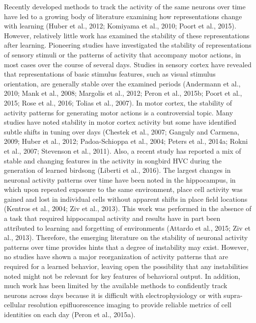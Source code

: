 Recently developed methods to track the activity of the same neurons over time have led to a growing body of literature examining how representations change with learning (Huber et al., 2012; Komiyama et al., 2010; Poort et al., 2015). However, relatively little work has examined the stability of these representations after learning. Pioneering studies have investigated the stability of representations of sensory stimuli or the patterns of activity that accompany motor actions, in most cases over the course of several days. Studies in sensory cortex have revealed that representations of basic stimulus features, such as visual stimulus orientation, are generally stable over the examined periods (Andermann et al., 2010; Mank et al., 2008; Margolis et al., 2012; Peron et al., 2015b; Poort et al., 2015; Rose et al., 2016; Tolias et al., 2007). In motor cortex, the stability of activity patterns for generating motor actions is a controversial topic. Many studies have noted stability in motor cortex activity but some have identified subtle shifts in tuning over days (Chestek et al., 2007; Ganguly and Carmena, 2009; Huber et al., 2012; Padoa-Schioppa et al., 2004; Peters et al., 2014a; Rokni et al., 2007; Stevenson et al., 2011). Also, a recent study has reported a mix of stable and changing features in the activity in songbird HVC during the generation of learned birdsong (Liberti et al., 2016). The largest changes in neuronal activity patterns over time have been noted in the hippocampus, in which upon repeated exposure to the same environment, place cell activity was gained and lost in individual cells without apparent shifts in place field locations (Kentros et al., 2004; Ziv et al., 2013). This work was performed in the absence of a task that required hippocampal activity and results have in part been attributed to learning and forgetting of environments (Attardo et al., 2015; Ziv et al., 2013). Therefore, the emerging literature on the stability of neuronal activity patterns over time provides hints that a degree of instability may exist. However, no studies have shown a major reorganization of activity patterns that are required for a learned behavior, leaving open the possibility that any instabilities noted might not be relevant for key features of behavioral output. In addition, much work has been limited by the available methods to confidently track neurons across days because it is difficult with electrophysiology or with supra-cellular resolution epifluorescence imaging to provide reliable metrics of cell identities on each day (Peron et al., 2015a).

